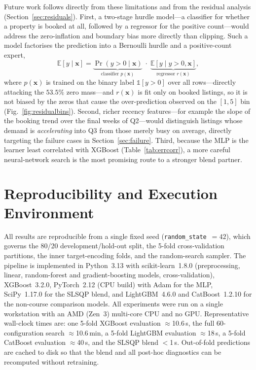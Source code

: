 \documentclass[journal]{IEEEtran}
\begin{document}
Future work follows directly from these limitations and from the residual
analysis (Section~\ref{sec:residuals}). First, a two-stage hurdle model---a
classifier for whether a property is booked at all, followed by a regressor for
the positive count---would address the zero-inflation and boundary bias more
directly than clipping. Such a model factorises the prediction into a Bernoulli
hurdle and a positive-count expert,
\begin{equation}
\mathbb{E}[y\mid\mathbf{x}] = \underbrace{\Pr(y>0\mid\mathbf{x})}_{\text{classifier }p(\mathbf{x})}\;\cdot\;\underbrace{\mathbb{E}[y\mid y>0,\mathbf{x}]}_{\text{regressor }r(\mathbf{x})},
\label{eq:hurdle}
\end{equation}
where $p(\mathbf{x})$ is trained on the binary label $\mathbb{1}[y>0]$ over all
rows---directly attacking the $53.5\%$ zero mass---and $r(\mathbf{x})$ is fit only
on booked listings, so it is not biased by the zeros that cause the
over-prediction observed on the $[1,5]$ bin (Fig.~\ref{fig:residualbins}).
Second, richer recency features---for example the slope of the booking trend over
the final weeks of Q2---would distinguish listings whose demand is
\emph{accelerating} into Q3 from those merely busy on average, directly targeting
the failure cases in Section~\ref{sec:failure}. Third, because the MLP is the
learner least correlated with XGBoost (Table~\ref{tab:errcorr}), a more careful
neural-network search is the most promising route to a stronger blend partner.




\appendices
\section{Reproducibility and Execution Environment}
\label{app:env}
All results are reproducible from a single fixed seed
(\texttt{random\_state}~$=42$), which governs the 80/20 development/hold-out
split, the 5-fold cross-validation partitions, the inner target-encoding folds,
and the random-search sampler. The pipeline is implemented in Python~3.13 with
scikit-learn~1.8.0 (preprocessing, linear, random-forest and gradient-boosting
models, cross-validation), XGBoost~3.2.0, PyTorch~2.12 (CPU build) with Adam for
the MLP, SciPy~1.17.0 for the SLSQP blend, and LightGBM~4.6.0 and CatBoost~1.2.10
for the non-course comparison models. All experiments were run on a single workstation with
an AMD (Zen~3) multi-core CPU and no GPU. Representative wall-clock times are:
one 5-fold XGBoost evaluation $\approx$10.6\,s, the full 60-configuration search
$\approx$10.6\,min, a 5-fold LightGBM evaluation $\approx$18\,s, a 5-fold CatBoost
evaluation $\approx$40\,s, and the SLSQP blend $<$1\,s. Out-of-fold predictions
are cached to disk so that the blend and all post-hoc diagnostics can be
recomputed without retraining.
\end{document}
